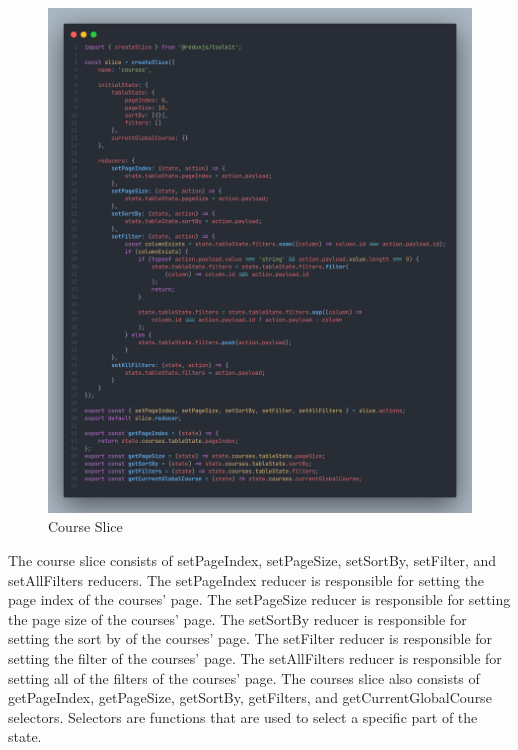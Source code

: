 \begin{justify}
        \begin{figure}[H]
            \centerline{\includegraphics[width=150mm,scale=1]{figures/implementation_and_testing/implementation/frontend/course_slice.png}}
            \caption{Course Slice}
        \end{figure}

        \vspace{0.25cm}
        \newendline The course slice consists of setPageIndex, setPageSize, setSortBy, setFilter, and setAllFilters reducers. The setPageIndex reducer is responsible for setting the page index of the courses' page. The setPageSize reducer is responsible for setting the page size of the courses' page. The setSortBy reducer is responsible for setting the sort by of the courses' page. The setFilter reducer is responsible for setting the filter of the courses' page. The setAllFilters reducer is responsible for setting all of the filters of the courses' page. The courses slice also consists of getPageIndex, getPageSize, getSortBy, getFilters, and getCurrentGlobalCourse selectors. Selectors are functions that are used to select a specific part of the state.


\end{justify}
